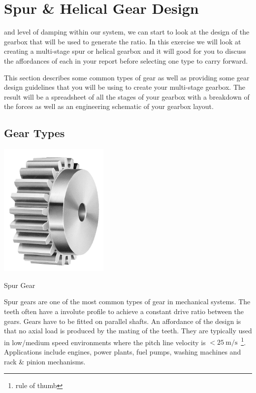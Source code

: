 \section{Spur \& Helical Gear Design}

 and level of damping within our system, we can start to look at the design of the gearbox that will be used to generate the ratio. In this exercise we will look at creating a multi-stage spur or helical gearbox and it will good for you to discuss the affordances of each in your report before selecting one type to carry forward.

This section describes some common types of gear as well as providing some gear design guidelines that you will be using to create your multi-stage gearbox. The result will be a spreadsheet of all the stages of your gearbox with a breakdown of the forces as well as an engineering schematic of your gearbox layout.

\subsection{Gear Types}

\begin{marginfigure}[10em]
  \centering
  \includegraphics[width=0.4\textwidth]{figs/spur.png}
  \caption{Spur Gear}
\end{marginfigure} 
Spur gears are one of the most common types of gear in mechanical systems. 
The teeth often have a involute profile to achieve a constant drive ratio between the gears. Gears have to be fitted on parallel shafts. An affordance of the design is that no axial load is produced by the mating of the teeth. They are typically used in low/medium speed environments where the pitch line velocity is $<\SI{25}{\metre\per\second}$~\footnote{rule of thumb}. Applications include engines, power plants, fuel pumps, washing machines and rack \& pinion mechanisms.

